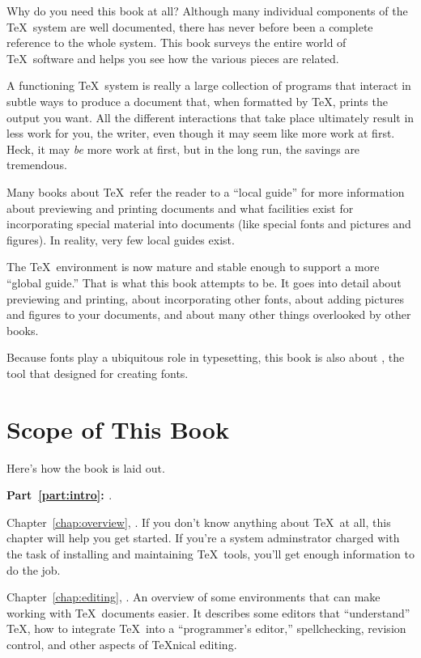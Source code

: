 Why do you need this book at all?  Although many individual components of the
\TeX\ system are well documented, there has never before been a complete
reference to the whole system.  This book surveys the entire world of \TeX\
software and helps you see how the various pieces are related.

A functioning \TeX\ system is really a large collection of programs that
interact in subtle ways to produce a document that, when formatted by \TeX,
prints the output you want.  All the different interactions that take place
ultimately result in less work for you, the writer, even though it may seem
like more work at first.  Heck, it may {\em be\/} more work at first, but in
the long run, the savings are tremendous.

Many books about \TeX\ refer the reader to a ``local guide'' for more
information about previewing and printing documents and what facilities exist
for incorporating special material into documents (like special fonts and
pictures and figures).  In reality, very few local guides exist.

The \TeX\ environment is now mature and stable enough to support a more
``global guide.''  That is what this book attempts to be.  It goes into detail
about previewing and printing, about incorporating other fonts, about adding
pictures and figures to your documents, and about many other things overlooked
by other books.

Because fonts play a ubiquitous role in typesetting, this book is also about
\MF, the tool that \ixx{Donald Knuth}{Knuth, Donald} designed for creating
fonts.

\section{Scope of This Book}

Here's how the book is laid out.

\textbf{Part~\ref{part:intro}: {\it {}}}.

Chapter~\ref{chap:overview}, {\it {}}.  If you don't know
anything about \TeX\ at all, this chapter will help you get started.  If
you're a system adminstrator charged with the task of installing and
maintaining \TeX\ tools, you'll get enough information to do the job.

Chapter~\ref{chap:editing}, {\it {}}.  An overview of some
environments that can make working with \TeX\ documents easier.  It describes
some editors that ``understand'' \TeX, how to integrate \TeX\ into a
``programmer's editor,'' spellchecking, revision control, and other aspects
of \TeX{}nical editing.

